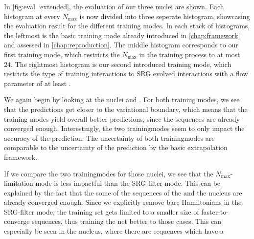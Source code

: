 In \autoref{fig:eval_extended}, the evaluation of our three nuclei are shown. Each histogram at every $N_\mathrm{max}$ is now divided into three seperate histogram, showcasing the evaluation result for the different training modes. In each stack of histograms, the leftmost is the basic training mode already introduced in \autoref{chap:framework} and assessed in \autoref{chap:reproduction}. The middle histogram corresponds to our first training mode, which restricts the $N_\mathrm{max}$ in the training process to at most 24. The rightmost histogram is our second introduced training mode, which restricts the type of training interactions to SRG evolved interactions with a flow parameter of at least .

We again begin by looking at the nuclei  and . For both training modes, we see that the predictions get closer to the variational boundary, which means that the training modes yield overall better predictions, since the sequences are already converged enough. Interestingly, the two trainingmodes seem to only impact the accuracy of the prediction. The uncertainty of both trainingmodes are comparable to the uncertainty of the prediction by the basic extrapolation framework.

If we compare the two trainingmodes for those nuclei, we see that the $N_\mathrm{max}$-limitation mode is less impactful than the SRG-filter mode. This can be explained by the fact that the some of the sequences of the  and the  nucleus are already converged enough. Since we explicitly remove bare Hamiltonians in the SRG-filter mode, the training set gets limited to a smaller size of faster-to-converge sequences, thus training the net better to those cases. This can especially be seen in the  nucleus, where there are sequences which have a




